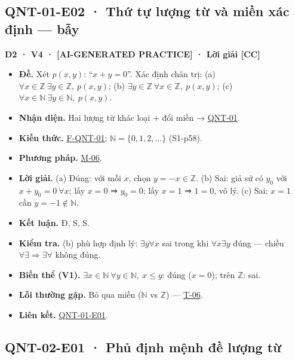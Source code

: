 \documentclass[
  10pt,
  twoside,openany]{book}
\providecommand{\tightlist}{%
  \setlength{\itemsep}{0pt}\setlength{\parskip}{0pt}}
\begin{document}
\hypertarget{QNT-01-E02}{%
\subsection{QNT-01-E02 · Thứ tự lượng từ và miền xác định ---
bẫy}\label{QNT-01-E02}}

\textbf{D2 · V4 · {[}AI-GENERATED PRACTICE{]} · Lời giải {[}CC{]}}

\begin{itemize}
\tightlist
\item
  \textbf{Đề.} Xét \(p(x,y)\): ``\(x+y=0\)''. Xác định chân trị: (a)
  \(\forall x\in\mathbb Z\ \exists y\in\mathbb Z,\ p(x,y)\); (b)
  \(\exists y\in\mathbb Z\ \forall x\in\mathbb Z,\ p(x,y)\); (c)
  \(\forall x\in\mathbb N\ \exists y\in\mathbb N,\ p(x,y)\).
\item
  \textbf{Nhận diện.} Hai lượng từ khác loại + đổi miền →
  \protect\hyperlink{QNT-01}{QNT-01}.
\item
  \textbf{Kiến thức.} \protect\hyperlink{F-QNT-01}{F-QNT-01};
  \(\mathbb N=\{0,1,2,\dots\}\) (S1-p58).
\item
  \textbf{Phương pháp.} \protect\hyperlink{M-06}{M-06}.
\item
  \textbf{Lời giải.} (a) Đúng: với mỗi \(x\), chọn \(y=-x\in\mathbb Z\).
  (b) Sai: giả sử có \(y_0\) với \(x+y_0=0\ \forall x\); lấy \(x=0\) ⇒
  \(y_0=0\); lấy \(x=1\) ⇒ \(1=0\), vô lý. (c) Sai: \(x=1\) cần
  \(y=-1\notin\mathbb N\).
\item
  \textbf{Kết luận.} Đ, S, S.
\item
  \textbf{Kiểm tra.} (b) phù hợp định lý: \(\exists y\forall x\) sai
  trong khi \(\forall x\exists y\) đúng --- chiều
  \(\forall\exists\Rightarrow\exists\forall\) không đúng.
\item
  \textbf{Biến thể (V1).}
  \(\exists x\in\mathbb N\ \forall y\in\mathbb N,\ x\le y\): đúng
  (\(x=0\)); trên \(\mathbb Z\): sai.
\item
  \textbf{Lỗi thường gặp.} Bỏ qua miền (\(\mathbb N\) vs \(\mathbb Z\))
  --- \protect\hyperlink{T-06}{T-06}.
\item
  \textbf{Liên kết.} \protect\hyperlink{QNT-01-E01}{QNT-01-E01}.
\end{itemize}

\hypertarget{QNT-02-E01}{%
\subsection{QNT-02-E01 · Phủ định mệnh đề lượng từ}\label{QNT-02-E01}}
\end{document}
